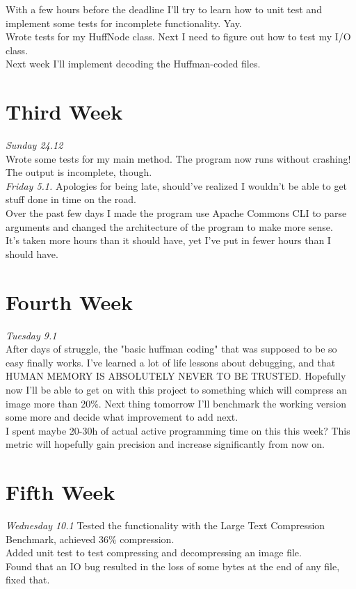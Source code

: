 \documentclass[11pt,a4paper,oneside,notitlepage,final]{article}
\begin{document}
	With a few hours before the deadline I'll try to learn how to unit test and implement some tests for incomplete functionality. Yay.\\
	Wrote tests for my HuffNode class. Next I need to figure out how to test my I/O class.\\
	Next week I'll implement decoding the Huffman-coded files.
	
	\section{Third Week}
	
	\emph{Sunday 24.12}\\
	Wrote some tests for my main method. The program now runs without crashing! The output is incomplete, though.\\
	
	\emph{Friday 5.1.}
	Apologies for being late, should've realized I wouldn't be able to get stuff done in time on the road.\\
	Over the past few days I made the program use Apache Commons CLI to parse arguments and changed the architecture of the program to make more sense.\\
	It's taken more hours than it should have, yet I've put in fewer hours than I should have.
	
	\section{Fourth Week}
	
	\emph{Tuesday 9.1}\\
	After days of struggle, the "basic huffman coding" that was supposed to be so easy finally works. I've learned a lot of life lessons about debugging, and that HUMAN MEMORY IS ABSOLUTELY NEVER TO BE TRUSTED. Hopefully now I'll be able to get on with this project to something which will compress an image more than 20\%. Next thing tomorrow I'll benchmark the working version some more and decide what improvement to add next.\\
	I spent maybe 20-30h of actual active programming time on this this week? This metric will hopefully gain precision and increase significantly from now on.
	
	\section{Fifth Week}
	\emph{Wednesday 10.1}
	Tested the functionality with the Large Text Compression Benchmark, achieved 36\% compression.\\Added unit test to test compressing and decompressing an image file.\\Found that an IO bug resulted in the loss of some bytes at the end of any file, fixed that.
	
\end{document}
